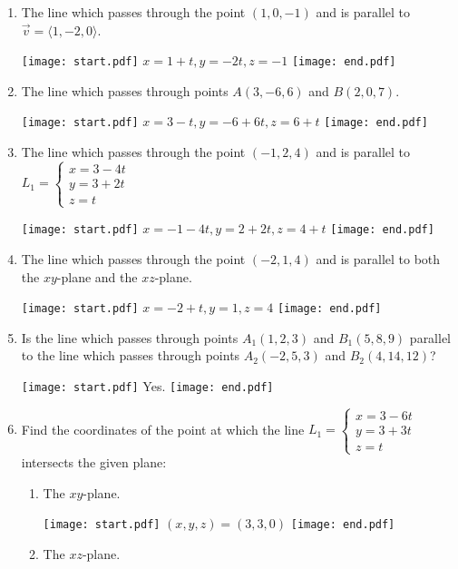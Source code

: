 \documentclass[12pt]{article}
\begin{document}
\begin{enumerate}

\item The line which passes through the point $(1,0,-1)$  and is parallel to $\overrightarrow{v}=\langle 1,-2,0\rangle$.

\texttt{[image: start.pdf]}
{{$x=1+t, y=-2t, z=-1$}}
\texttt{[image: end.pdf]}


\item The line which passes through points $A(3,-6,6)$ and $B(2,0,7)$.

\texttt{[image: start.pdf]}
{{$x=3-t,y=-6+6t,z=6+t$}}
\texttt{[image: end.pdf]}


\item The line which passes through the point $(-1,2,4)$ and is parallel to $L_1=\left\{\begin{array}{l}
x=3-4t\\
y=3+2t\\
z=t\end{array}\right.$

\texttt{[image: start.pdf]}
{{$x=-1-4t,y=2+2t,z=4+t$}}
\texttt{[image: end.pdf]}


\item The line which passes through the point $(-2,1,4)$ and is parallel to both the $xy$-plane and the $xz$-plane.

\texttt{[image: start.pdf]}
{{$x=-2+t,y=1,z=4$}}
\texttt{[image: end.pdf]}


\item Is the line which passes through points $A_1(1,2,3)$ and $B_1(5,8,9)$ parallel to the line which passes through points $A_2(-2,5,3)$ and $B_2(4,14,12)$?

\texttt{[image: start.pdf]}
{{Yes.}}
\texttt{[image: end.pdf]}


\item Find the coordinates of the point at which the line $L_1=\left\{\begin{array}{l}
x=3-6t\\
y=3+3t\\
z=t\end{array}\right.$ intersects the given plane:

\begin{enumerate}

\item The $xy$-plane.

\texttt{[image: start.pdf]}
{{$(x,y,z)=(3,3,0)$}}
\texttt{[image: end.pdf]}


\item The $xz$-plane.


\end{enumerate}
\end{enumerate}
\end{document}
